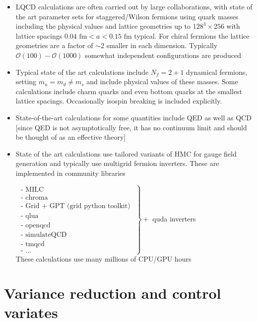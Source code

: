 \begin{itemize}
    \item LQCD calculations are often carried out by large collaborations, with state of the art parameter sets for staggered/Wilson fermions using quark masses including the physical values and lattice geometries up to $128^3\times256$ with lattice spacings $0.04 \text{ fm} < a < 0.15 \text{ fm}$ typical. For chiral fermions the lattice geometries are a factor of $\sim 2$ smaller in each dimension. Typically $\mathcal{O}(100)-\mathcal{O}(1000)$ somewhat independent configurations are produced
    \item Typical state of the art calculations include $N_f = 2+1$ dynamical fermions, setting $m_u = m_d \neq m_s$ and include physical values of these masses. Some calculations include charm quarks and even bottom quarks at the smallest lattice spacings. Occasionally isospin breaking is included explicitly.
    \item State-of-the-art calculations for some quantities include QED as well as QCD [since QED is not asymptotically free, it has no continuum limit and should be thought of as an effective theory]
    \item State of the art calculations use tailored variants of HMC for gauge field generation and typically use multigrid fermion inverters. These are implemented in community libraries

\(\left.\begin{array}{l}\text { - MILC } \\ \text { - chroma } \\ \text { - Grid + GPT (grid python toolkit) } \\ \text { - qlua } \\ \text { - openqcd }  \\ \text { - simulateQCD }  \\ \text { - tmqcd } \\ \text { - ... }\end{array}\right\}+\) quda inverters\\
These calculations use many millions of CPU/GPU hours
\end{itemize}


\section{Variance reduction and control variates}

